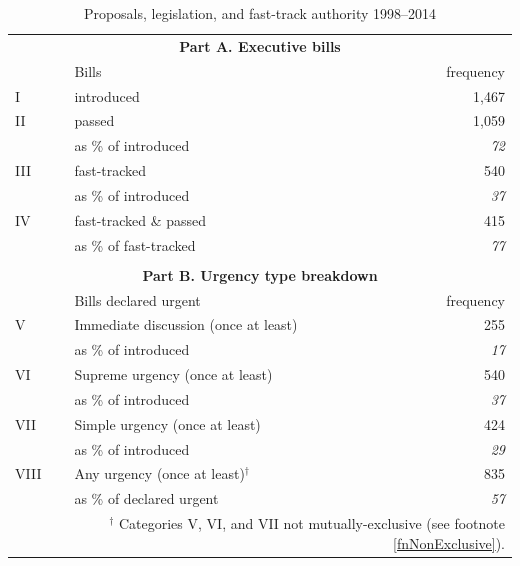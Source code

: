 \documentclass[letter,12pt]{article}
\begin{document}
\begin{table}
\centering
\caption{Proposals, legislation, and fast-track authority 1998--2014}\label{T:billDescriptives}
\begin{tabular}{llr}
\multicolumn{3}{c}{\textbf{Part A. Executive bills}} \\
   & Bills                           &   frequency  \\ \hline
I  & introduced                      &       1,467  \\ \hdashline
II & passed                          &       1,059  \\
   & as \% of introduced             &   \emph{72}  \\ \hdashline
III& fast-tracked                    &         540  \\
   & as \% of introduced             &   \emph{37}  \\ \hdashline
IV & fast-tracked \& passed          &         415  \\
   & as \% of fast-tracked           &   \emph{77}  \\ \hline
\\
\multicolumn{3}{c}{\textbf{Part B. Urgency type breakdown}} \\
    & Bills declared urgent                        &  frequency   \\ \hline
V   & Immediate discussion (once at least)         &         255  \\
    & as \% of introduced                          &   \emph{17}  \\ \hdashline
VI  & Supreme urgency (once at least)              &         540  \\
    & as \% of introduced                          &   \emph{37}  \\ \hdashline
VII & Simple urgency (once at least)               &         424  \\
    & as \% of introduced                          &   \emph{29}  \\ \hdashline
VIII& Any urgency (once at least)$^\dagger$          &         835  \\
    & as \% of declared urgent                    &   \emph{57}  \\
\hline
\multicolumn{3}{r}{\footnotesize{$^\dagger$ Categories V, VI, and VII not mutually-exclusive (see footnote \ref{fnNonExclusive}).}} \\
\end{tabular}
\end{table}
\end{document}
